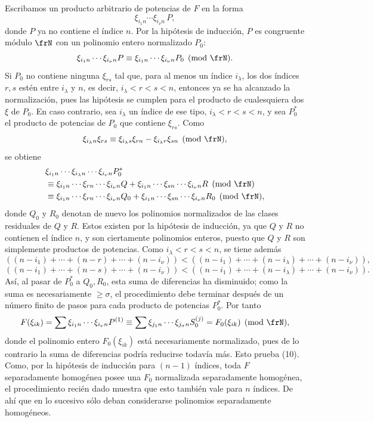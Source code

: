 \documentclass[11pt]{article}
\begin{document}
Escribamos un producto arbitrario de potencias de \(F\) en la forma
\[
        \xi_{i_1n}\cdots\xi_{i_\nu n}\,P,
\]
donde \(P\) ya no contiene el índice \(n\). Por la hipótesis de inducción, \(P\) es congruente módulo \(\frN\) con un polinomio entero normalizado \(P_0\):
\[
        \xi_{i_1n}\cdots\xi_{i_\nu n}P
        \equiv
        \xi_{i_1n}\cdots\xi_{i_\nu n}P_0
        \pmod{\frN}.
\]
Si \(P_0\) no contiene ninguna \(\xi_{rs}\) tal que, para al menos un índice \(i_\lambda\), los dos índices \(r,s\) estén entre \(i_\lambda\) y \(n\), es decir, \(i_\lambda<r<s<n\), entonces ya se ha alcanzado la normalización, pues las hipótesis se cumplen para el producto de cualesquiera dos \(\xi\) de \(P_0\). En caso contrario, sea \(i_\lambda\) un índice de ese tipo, \(i_\lambda<r<s<n\), y sea \(P_0^*\) el producto de potencias de \(P_0\) que contiene \(\xi_{rs}\). Como
\[
        \xi_{i_\lambda n}\xi_{rs}\equiv
        \xi_{i_\lambda s}\xi_{rn}-\xi_{i_\lambda r}\xi_{sn}
        \pmod{\frN},
\]
se obtiene
\begin{align*}
 &\xi_{i_1n}\cdots\xi_{i_\lambda n}\cdots\xi_{i_\nu n}P_0^*\\
 &\equiv
 \xi_{i_1n}\cdots\xi_{rn}\cdots\xi_{i_\nu n}Q
 +
 \xi_{i_1n}\cdots\xi_{sn}\cdots\xi_{i_\nu n}R
 \pmod{\frN}\\
 &\equiv
 \xi_{i_1n}\cdots\xi_{rn}\cdots\xi_{i_\nu n}Q_0
 +
 \xi_{i_1n}\cdots\xi_{sn}\cdots\xi_{i_\nu n}R_0
 \pmod{\frN},
\end{align*}
donde \(Q_0\) y \(R_0\) denotan de nuevo los polinomios normalizados de las clases residuales de \(Q\) y \(R\). Estos existen por la hipótesis de inducción, ya que \(Q\) y \(R\) no contienen el índice \(n\), y son ciertamente polinomios enteros, puesto que \(Q\) y \(R\) son simplemente productos de potencias. Como \(i_\lambda<r<s<n\), se tiene además
\[
 ((n-i_1)+\cdots+(n-r)+\cdots+(n-i_\nu))
 <
 ((n-i_1)+\cdots+(n-i_\lambda)+\cdots+(n-i_\nu)),
\]
\[
 ((n-i_1)+\cdots+(n-s)+\cdots+(n-i_\nu))
 <
 ((n-i_1)+\cdots+(n-i_\lambda)+\cdots+(n-i_\nu)).
\]
Así, al pasar de \(P_0^*\) a \(Q_0,R_0\), esta suma de diferencias ha disminuido; como la suma es necesariamente \(\ge\sigma\), el procedimiento debe terminar después de un número finito de pasos para cada producto de potencias \(P_0^*\). Por tanto
\[
        F(\xi_{ik})
        =
        \sum \xi_{i_1n}\cdots\xi_{i_\nu n}P^{(1)}
        \equiv
        \sum \xi_{j_1n}\cdots\xi_{j_\sigma n}S_0^{(j)}
        =
        F_0(\xi_{ik})\pmod{\frN},
\]
donde el polinomio entero \(F_0(\xi_{ik})\) está necesariamente normalizado, pues de lo contrario la suma de diferencias podría reducirse todavía más. Esto prueba (10). Como, por la hipótesis de inducción para \((n-1)\) índices, toda \(F\) separadamente homogénea posee una \(F_0\) normalizada separadamente homogénea, el procedimiento recién dado muestra que esto también vale para \(n\) índices. De ahí que en lo sucesivo sólo deban considerarse polinomios separadamente homogéneos.
\end{document}
